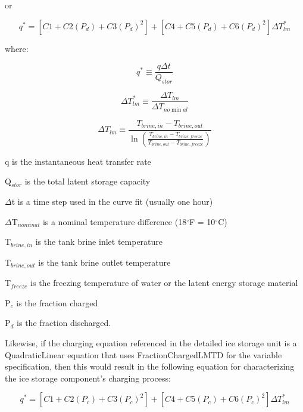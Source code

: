 or

\begin{equation}
{q^*} = \left[ {C1 + C2\left( {{P_d}} \right) + C3{{\left( {{P_d}} \right)}^2}} \right] + \left[ {C4 + C5\left( {{P_d}} \right) + C6{{\left( {{P_d}} \right)}^2}} \right]\Delta T_{lm}^*
\end{equation}

where:

\begin{equation}
{q^*} \equiv \frac{{q\Delta t}}{{{Q_{stor}}}}
\end{equation}

\begin{equation}
\Delta T_{lm}^* \equiv \frac{{\Delta {T_{lm}}}}{{\Delta {T_{no\min al}}}}
\end{equation}

\begin{equation}
\Delta {T_{lm}} \equiv \frac{{{T_{brine,in}} - {T_{brine,out}}}}{{\ln \left( {\frac{{{T_{brine,in}} - {T_{brine,freeze}}}}{{{T_{brine,out}} - {T_{brine,freeze}}}}} \right)}}
\end{equation}

q is the instantaneous heat transfer rate

Q\(_{stor}\) is the total latent storage capacity

\(\Delta\)t is a time step used in the curve fit (usually one hour)

\(\Delta\)T\(_{nominal}\) is a nominal temperature difference (18\(^{\circ}\)F = 10\(^{\circ}\)C)

T\(_{brine,in}\) is the tank brine inlet temperature

T\(_{brine,out}\) is the tank brine outlet temperature

T\(_{freeze}\) is the freezing temperature of water or the latent energy storage material

P\(_{c}\) is the fraction charged

P\(_{d}\) is the fraction discharged.

Likewise, if the charging equation referenced in the detailed ice storage unit is a QuadraticLinear equation that uses FractionChargedLMTD for the variable specification, then this would result in the following equation for characterizing the ice storage component's charging process:

\begin{equation}
{q^*} = \left[ {C1 + C2\left( {{P_c}} \right) + C3{{\left( {{P_c}} \right)}^2}} \right] + \left[ {C4 + C5\left( {{P_c}} \right) + C6{{\left( {{P_c}} \right)}^2}} \right]\Delta T_{lm}^*
\end{equation}

